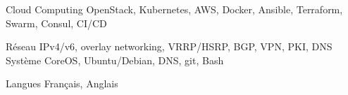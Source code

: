 

\begin{cvskills}

  \cvskill
    {Cloud Computing}
    {OpenStack, Kubernetes, AWS, Docker, Ansible, Terraform, Swarm, Consul, CI/CD}

  \cvskill
    {Réseau}
    {IPv4/v6, overlay networking, VRRP/HSRP, BGP, VPN, PKI, DNS}
  \cvskill
    {Système}
    {CoreOS, Ubuntu/Debian, DNS, git, Bash}


  \cvskill
    {Langues} %
    {Français, Anglais} %

\end{cvskills}
